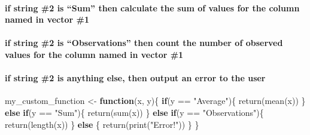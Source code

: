 \documentclass[
]{article}
\newenvironment{Shaded}{\begin{snugshade}}{\end{snugshade}}
\newcommand{\ControlFlowTok}[1]{\textcolor[rgb]{0.13,0.29,0.53}{\textbf{#1}}}
\newcommand{\FunctionTok}[1]{\textcolor[rgb]{0.00,0.00,0.00}{#1}}
\newcommand{\NormalTok}[1]{#1}
\newcommand{\OtherTok}[1]{\textcolor[rgb]{0.56,0.35,0.01}{#1}}
\newcommand{\SpecialCharTok}[1]{\textcolor[rgb]{0.00,0.00,0.00}{#1}}
\newcommand{\StringTok}[1]{\textcolor[rgb]{0.31,0.60,0.02}{#1}}
\begin{document}
\hypertarget{if-string-2-is-sum-then-calculate-the-sum-of-values-for-the-column-named-in-vector-1}{%
\paragraph{if string \#2 is ``Sum'' then calculate the sum of values for
the column named in vector
\#1}\label{if-string-2-is-sum-then-calculate-the-sum-of-values-for-the-column-named-in-vector-1}}

\hypertarget{if-string-2-is-observations-then-count-the-number-of-observed-values-for-the-column-named-in-vector-1}{%
\paragraph{if string \#2 is ``Observations'' then count the number of
observed values for the column named in vector
\#1}\label{if-string-2-is-observations-then-count-the-number-of-observed-values-for-the-column-named-in-vector-1}}

\hypertarget{if-string-2-is-anything-else-then-output-an-error-to-the-user}{%
\paragraph{if string \#2 is anything else, then output an error to the
user}\label{if-string-2-is-anything-else-then-output-an-error-to-the-user}}

\begin{Shaded}
\begin{Highlighting}[]
\NormalTok{my\_custom\_function }\OtherTok{\textless{}{-}} \ControlFlowTok{function}\NormalTok{(x, y)\{}
  \ControlFlowTok{if}\NormalTok{(y }\SpecialCharTok{==} \StringTok{"Average"}\NormalTok{)\{}
    \FunctionTok{return}\NormalTok{(}\FunctionTok{mean}\NormalTok{(x))}
\NormalTok{  \} }\ControlFlowTok{else} \ControlFlowTok{if}\NormalTok{(y }\SpecialCharTok{==} \StringTok{"Sum"}\NormalTok{)\{}
    \FunctionTok{return}\NormalTok{(}\FunctionTok{sum}\NormalTok{(x))}
\NormalTok{  \} }\ControlFlowTok{else} \ControlFlowTok{if}\NormalTok{(y }\SpecialCharTok{==} \StringTok{"Observations"}\NormalTok{)\{}
    \FunctionTok{return}\NormalTok{(}\FunctionTok{length}\NormalTok{(x))}
\NormalTok{  \} }\ControlFlowTok{else}\NormalTok{ \{}
    \FunctionTok{return}\NormalTok{(}\FunctionTok{print}\NormalTok{(}\StringTok{"Error!"}\NormalTok{))}
\NormalTok{  \}}
\NormalTok{\}}
\end{Highlighting}
\end{Shaded}
\end{document}
